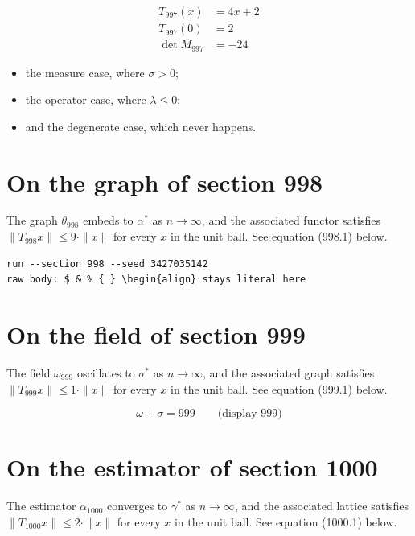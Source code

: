 \documentclass{article}
\begin{document}
\begin{align}
T_{997}(x) &= 4 x + 2 \\
T_{997}(0) &= 2 \\
\det M_{997} &= -24
\end{align}

\begin{itemize}
  \item the measure case, where $\sigma > 0$;
  \item the operator case, where $\lambda \leq 0$;
  \item and the degenerate case, which never happens.
\end{itemize}

\section{On the graph of section 998}
The graph $\theta_{998}$ embeds to $\alpha^{*}$ as $n \to \infty$,
and the associated functor satisfies $\|T_{998} x\| \leq 9 \cdot \|x\|$
for every $x$ in the unit ball. See equation (998.1) below.

\begin{verbatim}
run --section 998 --seed 3427035142
raw body: $ & % { } \begin{align} stays literal here
\end{verbatim}

\section{On the field of section 999}
The field $\omega_{999}$ oscillates to $\sigma^{*}$ as $n \to \infty$,
and the associated graph satisfies $\|T_{999} x\| \leq 1 \cdot \|x\|$
for every $x$ in the unit ball. See equation (999.1) below.

$$
\omega + \sigma = 999 \qquad \text{(display 999)}
$$

\section{On the estimator of section 1000}
The estimator $\alpha_{1000}$ converges to $\gamma^{*}$ as $n \to \infty$,
and the associated lattice satisfies $\|T_{1000} x\| \leq 2 \cdot \|x\|$
for every $x$ in the unit ball. See equation (1000.1) below.
\end{document}
